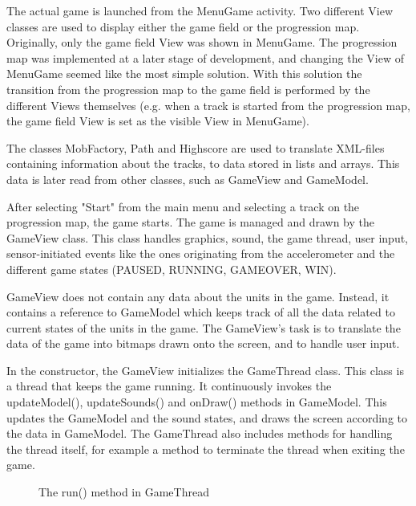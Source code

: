 The actual game is launched from the MenuGame activity. Two different View classes are used to display either the game field or the progression map. Originally, only the game field View was shown in MenuGame. The progression map was implemented at a later stage of development, and changing the View of MenuGame seemed like the most simple solution. With this solution the transition from the progression map to the game field is performed by the different Views themselves (e.g. when a track is started from the progression map, the game field View is set as the visible View in MenuGame).

The classes MobFactory, Path and Highscore are used to translate XML-files containing information about the tracks, to data stored in lists and arrays. This data is later read from other classes, such as GameView and GameModel.
 
After selecting "Start" from the main menu and selecting a track on the progression map, the game starts. The game is managed and drawn by the GameView class. This class handles graphics, sound, the game thread, user input, sensor-initiated events like the ones originating from the accelerometer and the different game states (PAUSED, RUNNING, GAMEOVER, WIN).

GameView does not contain any data about the units in the game. Instead, it contains a reference to GameModel which keeps track of all the data related to current states of the units in the game. The GameView's task is to translate the data of the game into bitmaps drawn onto the screen, and to handle user input. 

In the constructor, the GameView initializes the GameThread class. This class is a thread that keeps the game running. It continuously invokes the updateModel(), updateSounds() and onDraw() methods in GameModel. This updates the GameModel and the sound states, and draws the screen according to the data in GameModel. The GameThread also includes methods for handling the thread itself, for example a method to terminate the thread when exiting the game.

\begin{figure}[htb]

\begin{small}

\end{small}

\caption{The run() method in GameThread}
\label{fig:codeExGameThread}
\end{figure}

